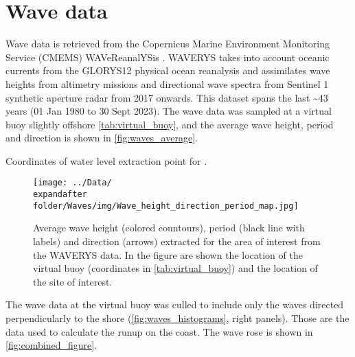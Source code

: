 \documentclass[a4paper, 11pt]{article}
\begin{document}
\pagebreak

\section*{Wave data}
Wave data is retrieved from the Copernicus Marine Environment Monitoring Service (CMEMS) WAVeReanalYSis \citep[WAVERYS,][]{law2021waverys}. WAVERYS takes into account oceanic currents from the GLORYS12 physical ocean reanalysis \citep{lellouche2018recent} and assimilates wave heights from altimetry missions and  directional wave spectra from Sentinel 1 synthetic aperture radar from 2017 onwards. This dataset spans the last \textasciitilde43 years (01 Jan 1980 to 30 Sept 2023). The wave data was sampled at a virtual buoy slightly offshore \sitename  \autoref{tab:virtual_buoy}, and the average wave height, period and direction is shown in \autoref{fig:waves_average}.

\begin{table}[ht]
    \centering
    \caption{Coordinates of water level extraction point for \sitename.}
    \label{tab:virtual_buoy}
\end{table}


\begin{figure}[ht]
    \centering
	\texttt{[image: ../Data/\\expandafter\\folder/Waves/img/Wave\_height\_direction\_period\_map.jpg]}
    \caption{Average wave height (colored countours), period (black line with labels) and direction (arrows) extracted for the area of interest from the WAVERYS data. In the figure are shown the location of the virtual buoy (coordinates in \autoref{tab:virtual_buoy}) and the location of the site of interest.}
	\label{fig:waves_average}
\end{figure}

\pagebreak
The wave data at the virtual buoy was culled to include only the waves directed perpendicularly to the shore (\autoref{fig:waves_histograms}, right panels). Those are the data used to calculate the runup on the coast. The wave rose is shown in \autoref{fig:combined_figure}.
\end{document}
